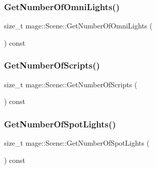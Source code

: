 \hypertarget{classmage_1_1_scene_ac043f20c6cf845244a3258593b3c2814}{}\label{classmage_1_1_scene_ac043f20c6cf845244a3258593b3c2814} 
\subsubsection{\texorpdfstring{Get\+Number\+Of\+Omni\+Lights()}{GetNumberOfOmniLights()}}
{\footnotesize\ttfamily size\+\_\+t mage\+::\+Scene\+::\+Get\+Number\+Of\+Omni\+Lights (\begin{DoxyParamCaption}{ }\end{DoxyParamCaption}) const\hspace{0.3cm}{\ttfamily [noexcept]}}

\hypertarget{classmage_1_1_scene_a33cecd2fd2b393ccac84b94ec8cc53c0}{}\label{classmage_1_1_scene_a33cecd2fd2b393ccac84b94ec8cc53c0} 
\subsubsection{\texorpdfstring{Get\+Number\+Of\+Scripts()}{GetNumberOfScripts()}}
{\footnotesize\ttfamily size\+\_\+t mage\+::\+Scene\+::\+Get\+Number\+Of\+Scripts (\begin{DoxyParamCaption}{ }\end{DoxyParamCaption}) const\hspace{0.3cm}{\ttfamily [noexcept]}}

\hypertarget{classmage_1_1_scene_af7bdbd447a50beb83ae5573f7e5505db}{}\label{classmage_1_1_scene_af7bdbd447a50beb83ae5573f7e5505db} 
\subsubsection{\texorpdfstring{Get\+Number\+Of\+Spot\+Lights()}{GetNumberOfSpotLights()}}
{\footnotesize\ttfamily size\+\_\+t mage\+::\+Scene\+::\+Get\+Number\+Of\+Spot\+Lights (\begin{DoxyParamCaption}{ }\end{DoxyParamCaption}) const\hspace{0.3cm}{\ttfamily [noexcept]}}

